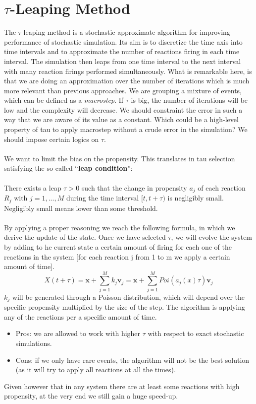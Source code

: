 \section{\texorpdfstring{$\tau$-Leaping Method}{-Leaping Method}}
The $\tau$-leaping method is a stochastic approximate algorithm for improving performance of stochastic simulation.
Its aim is to discretize the time axis into time intervals and to approximate the number of reactions firing in each time interval.
The simulation then leaps from one time interval to the next interval with many reaction firings performed simultaneously.
What is remarkable here, is that we are doing an approximation over the number of iterations which is much more relevant than previous approaches.
We are grouping a mixture of events, which can be defined as a \emph{macrostep}.
If $\tau$ is big, the number of iterations will be low and the complexity will decrease.
We should constraint the error in such a way that we are aware of its value as a constant.
Which could be a high-level property of tau to apply macrostep without a crude error in the simulation? We should impose certain logics on $\tau$.
\\
\\
\noindent
We want to limit the bias on the propensity.
This translates in tau selection satisfying the so-called ``\textbf{leap condition}'':
\\
\\
\noindent
There exists a leap $\tau > 0$ such that the change in propensity $a_j$ of each reaction $R_j$ with $j = 1,...,M$ during the time interval $[t,t +\tau)$ is negligibly small.
Negligibly small means lower than some threshold.
\\
\\
\noindent
By applying a proper reasoning we reach the following formula, in which we derive the update of the state.
Once we have selected $\tau$, we will evolve the system by adding to he current state a certain amount of firing for each one of the reactions in the system {[}for each reaction j from 1 to m we apply a certain amount of time{]}.
$$ X(t+\tau)=\mathbf{x}+\sum_{j=1}^{M}k_j\mathbf{v}_j =\mathbf{x}+\sum_{j=1}^{M}Poi(a_j(x)\tau)\mathbf{v}_j $$
$k_j$ will be generated through a Poisson distribution, which will depend over the specific propensity multiplied by the size of the step.
The algorithm is applying any of the reactions per a specific amount of time.
\begin{itemize}
\item Pros: we are allowed to work with higher $\tau$ with respect to exact stochastic simulations.
\item Cons: if we only have rare events, the algorithm will not be the best solution (as it will try to apply all reactions at all the times).
\end{itemize}
\noindent
Given however that in any system there are at least some reactions with high propensity, at the very end we still gain a huge speed-up.

